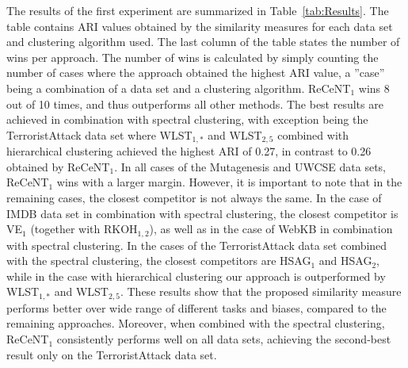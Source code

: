 The results of the first experiment are summarized in Table~\ref{tab:Results}.
The table contains ARI values obtained by the similarity measures for each data set and clustering algorithm used.
The last column of the table states the number of wins per approach.
The number of wins is calculated by simply counting the number of cases where the approach obtained the highest ARI value, a ''case'' being a combination of a data set and a clustering algorithm.
ReCeNT$_1$ wins 8 out of 10 times, and thus outperforms all other methods.
The best results are achieved in combination with spectral clustering, with exception being the TerroristAttack data set where WLST$_{1,*}$ and WLST$_{2,5}$ combined with hierarchical clustering achieved the highest ARI of 0.27, in contrast to 0.26 obtained by ReCeNT$_1$.
In all cases of the Mutagenesis and UWCSE data sets, ReCeNT$_1$ wins with a larger margin.
However, it is important to note that in the remaining cases, the closest competitor is not always the same.
In the case of IMDB data set in combination with spectral clustering, the closest competitor is VE$_1$ (together with RKOH$_{1,2}$), as well as in the case of WebKB in combination with spectral clustering.
In the cases of the TerroristAttack data set combined with the spectral clustering, the closest competitors are HSAG$_1$ and HSAG$_2$, while in the case with hierarchical clustering our approach is outperformed by WLST$_{1,*}$ and WLST$_{2,5}$.
These results show that the proposed similarity measure performs better over wide range of different tasks and biases, compared to the remaining approaches.
Moreover, when combined with the spectral clustering, ReCeNT$_1$ consistently performs well on all data sets, achieving the second-best result only on the TerroristAttack data set.



